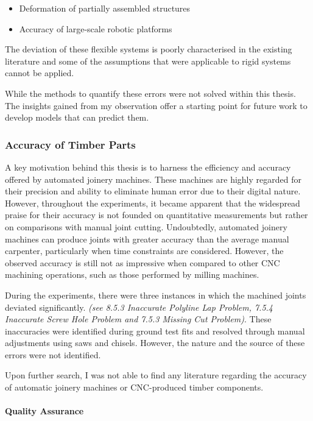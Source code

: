 \documentclass[11pt]{book}
\begin{document}
\begin{itemize}
	\item Deformation of partially assembled structures

	\item Accuracy of large-scale robotic platforms

\end{itemize}
The deviation of these flexible systems is poorly characterised in the existing literature and some of the assumptions that were applicable to rigid systems cannot be applied. 

While the methods to quantify these errors were not solved within this thesis. The insights gained from my observation offer a starting point for future work to develop models that can predict them. 

\subsubsection{Accuracy of Timber Parts}

A key motivation behind this thesis is to harness the efficiency and accuracy offered by automated joinery machines. These machines are highly regarded for their precision and ability to eliminate human error due to their digital nature. However, throughout the experiments, it became apparent that the widespread praise for their accuracy is not founded on quantitative measurements but rather on comparisons with manual joint cutting. Undoubtedly, automated joinery machines can produce joints with greater accuracy than the average manual carpenter, particularly when time constraints are considered. However, the observed accuracy is still not as impressive when compared to other CNC machining operations, such as those performed by milling machines.

During the experiments, there were three instances in which the machined joints deviated significantly. \textit{(see 8.5.3 Inaccurate Polyline Lap Problem, 7.5.4 Inaccurate Screw Hole Problem and 7.5.3 Missing Cut Problem)}. These inaccuracies were identified during ground test fits and resolved through manual adjustments using saws and chisels. However, the nature and the source of these errors were not identified. 

Upon further search, I was not able to find any literature regarding the accuracy of automatic joinery machines or CNC-produced timber components.

\paragraph{Quality Assurance}
\end{document}
